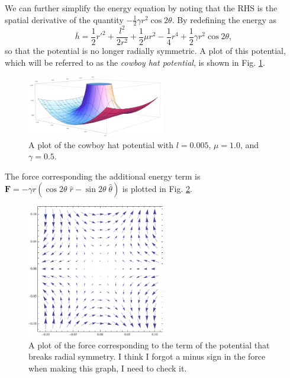 \documentclass[api,pof,pre,12pt,a4paper]{revtex4-1}
\newcommand{\beqn}{\begin{equation}}
\newcommand{\eeqn}{\end{equation}}
\newcommand{\half}{\ensuremath{\frac{1}{2}}}
\newcommand{\FIGcowboy}{
\begin{figure}[t]\center
\includegraphics[width=60mm]{CowboyHatPotential.pdf}
\caption{\label{fig:CowboyHat} A plot of the cowboy hat potential with $l=0.005$, $\mu=1.0$, and $\gamma=0.5$.}
\end{figure}
}
\newcommand{\FIGforce}{
\begin{figure}[t]\center
\includegraphics[width=60mm]{CowboyField.pdf}
\caption{\label{fig:CowboyForce} A plot of the force corresponding to the term of the potential that breaks radial symmetry.  I think I forgot a minus sign in the force when making this graph, I need to check it.}
\end{figure}
}
\begin{document}
We can further simplify the energy equation by noting that the RHS is the spatial derivative of the quantity $-\half \gamma r^2 \cos 2 \theta$. By redefining the energy as
\beqn
\bar{h}=\frac{1}{2} r'^2 +\frac{l^2}{2r^2} +\frac{1}{2}\mu r^2 -\frac{1}{4} r^4+\half \gamma r^2 \cos 2 \theta,
\label{eq:CowboyHat}
\eeqn
so that the potential is no longer radially symmetric.  A plot of this potential, which will be referred to as the {\it cowboy hat potential}, is shown in Fig. \ref{fig:CowboyHat}.
\FIGcowboy
The force corresponding the additional energy term is $\mathbf{F}=-\gamma r (\cos2\theta \;\hat{r} - \sin2\theta \; \hat{\theta})$ is plotted in Fig. \ref{fig:CowboyForce}. 
\FIGforce


\end{document}
